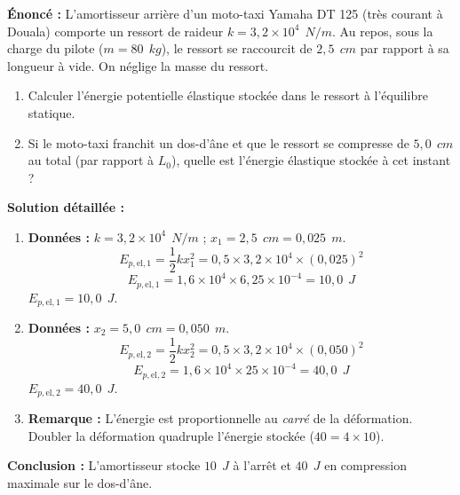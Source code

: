 \documentclass[11pt]{article}
\begin{document}
\begin{exoresolu}
    \textbf{Énoncé :} L'amortisseur arrière d'un moto-taxi Yamaha DT 125 (très courant à Douala) comporte un ressort de raideur $k = 3,2 \times 10^4\ \SI{}{N/m}$. Au repos, sous la charge du pilote ($m = 80\ \SI{}{kg}$), le ressort se raccourcit de $2,5\ \SI{}{cm}$ par rapport à sa longueur à vide. On néglige la masse du ressort.
    \begin{enumerate}
        \item Calculer l'énergie potentielle élastique stockée dans le ressort à l'équilibre statique.
        \item Si le moto-taxi franchit un dos-d'âne et que le ressort se compresse de $5,0\ \SI{}{cm}$ au total (par rapport à $L_0$), quelle est l'énergie élastique stockée à cet instant ?
    \end{enumerate}
    \tcblower
    \textbf{Solution détaillée :}
    \begin{enumerate}
        \item \textbf{Données :} $k = 3,2 \times 10^4\ \SI{}{N/m}$ ; $x_1 = 2,5\ \SI{}{cm} = 0,025\ \SI{}{m}$.
        \[ E_{p,\text{el},1} = \frac{1}{2} k x_1^2 = 0,5 \times 3,2 \times 10^4 \times (0,025)^2 \]
        \[ E_{p,\text{el},1} = 1,6 \times 10^4 \times 6,25 \times 10^{-4} = 10,0\ \SI{}{J} \]
        $\boxed{E_{p,\text{el},1} = 10,0\ \SI{}{J}}$.
        \item \textbf{Données :} $x_2 = 5,0\ \SI{}{cm} = 0,050\ \SI{}{m}$.
        \[ E_{p,\text{el},2} = \frac{1}{2} k x_2^2 = 0,5 \times 3,2 \times 10^4 \times (0,050)^2 \]
        \[ E_{p,\text{el},2} = 1,6 \times 10^4 \times 25 \times 10^{-4} = 40,0\ \SI{}{J} \]
        $\boxed{E_{p,\text{el},2} = 40,0\ \SI{}{J}}$.
        \item \textbf{Remarque :} L'énergie est proportionnelle au \emph{carré} de la déformation. Doubler la déformation quadruple l'énergie stockée ($40 = 4 \times 10$).
    \end{enumerate}
    \textbf{Conclusion :} L'amortisseur stocke $10\ \SI{}{J}$ à l'arrêt et $40\ \SI{}{J}$ en compression maximale sur le dos-d'âne.
\end{exoresolu}
\end{document}
